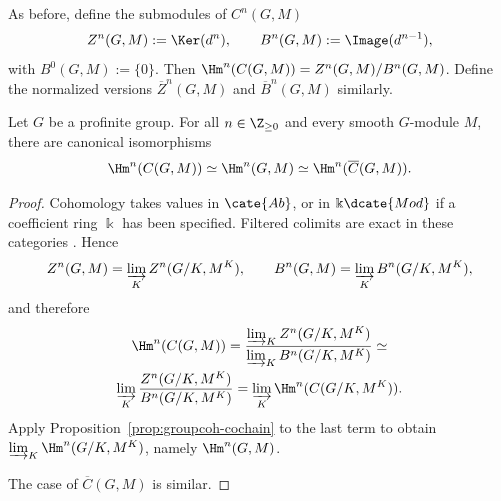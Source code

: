 As before, define the submodules of $C^n(G,M)$
\[ Z^n(G,M):=\Ker(d^n),\qquad B^n(G,M):=\Image(d^{n-1}), \]
with $B^0(G,M):=\{0\}$. Then
$\Hm^n(C(G,M))=Z^n(G,M)/B^n(G,M)$. Define the normalized versions
$\overline{Z}^n(G,M)$ and $\overline{B}^n(G,M)$ similarly.

\begin{theorem}\label{prop:profinite-group-standard}
	Let $G$ be a profinite group. For all $n\in\Z_{\geq0}$ and every smooth
	$G$-module $M$, there are canonical isomorphisms
	\[ \Hm^n(C(G,M))\simeq\Hm^n(G,M)
	\simeq\Hm^n(\overline{C}(G,M)). \]
\end{theorem}
\begin{proof}
	Cohomology takes values in $\cate{Ab}$, or in $\Bbbk\dcate{Mod}$ if a
	coefficient ring $\Bbbk$ has been specified. Filtered colimits are exact
	in these categories \cite[Theorem 6.2.2]{Li1}. Hence
	\[ Z^n(G,M)=\varinjlim_KZ^n(G/K,M^K),\qquad
	B^n(G,M)=\varinjlim_KB^n(G/K,M^K), \]
	and therefore
	\begin{multline*}
		\Hm^n(C(G,M))
		=\dfrac{\varinjlim_KZ^n(G/K,M^K)}
		{\varinjlim_KB^n(G/K,M^K)}\simeq\\
		\varinjlim_K\frac{Z^n(G/K,M^K)}{B^n(G/K,M^K)}
		=\varinjlim_K\Hm^n(C(G/K,M^K)).
	\end{multline*}
	Apply Proposition~\ref{prop:groupcoh-cochain} to the last term to obtain
	$\varinjlim_K\Hm^n(G/K,M^K)$, namely $\Hm^n(G,M)$.

	The case of $\overline{C}(G,M)$ is similar.
\end{proof}
